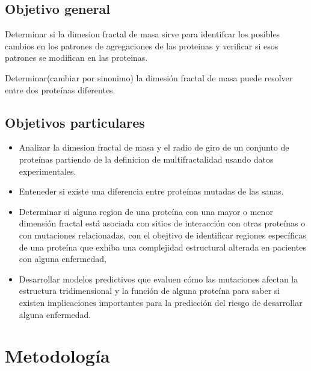 \documentclass[11pt]{article}
\begin{document}
\subsection{Objetivo general}
Determinar si la dimesion fractal de masa sirve para identifcar los posibles cambios en los patrones de agregaciones de las proteinas y verificar si esos patrones se modifican en las proteinas.


Determinar(cambiar por sinonimo) la dimesión fractal de masa puede resolver entre dos proteínas diferentes.
\subsection{Objetivos particulares}

\begin{itemize}

\item Analizar la dimesion fractal de masa y el radio de giro de un conjunto de proteínas partiendo de la definicion de multifractalidad usando datos experimentales.


\item Enteneder si existe una diferencia entre proteínas mutadas de las sanas.

\item Determinar si alguna region de una proteína con una mayor o menor dimensión fractal está asociada con sitios de interacción con otras proteínas o con mutaciones relacionadas, con el obejtivo de identificar regiones específicas de una proteína que exhiba una complejidad estructural alterada en pacientes con  alguna enfermedad, 

\item Desarrollar modelos predictivos que evaluen cómo las mutaciones  afectan la estructura tridimensional y la función de alguna proteína  para saber si existen implicaciones importantes para la predicción del riesgo de desarrollar alguna enfermedad.

\end{itemize}

\clearpage

\section{Metodología}
\end{document}
